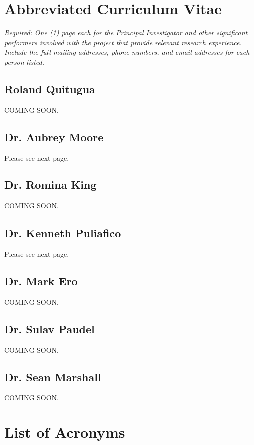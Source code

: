 \documentclass[11pt,english,letterpaper]{scrartcl}
\begin{document}
\appendix

\newpage

\section{Abbreviated Curriculum Vitae}

\textit{Required: One (1) page each for the Principal Investigator and other significant performers involved with the project that provide relevant research experience. Include the full mailing addresses, phone numbers, and email addresses for each person listed.}

\subsection{Roland Quitugua}
COMING SOON.

\subsection{Dr. Aubrey Moore}
Please see next page.


\subsection{Dr. Romina King}
COMING SOON.

\subsection{Dr. Kenneth Puliafico}
Please see next page.


\subsection{Dr. Mark Ero}
COMING SOON.

\subsection{Dr. Sulav Paudel}
COMING SOON.

\subsection{Dr. Sean Marshall}
COMING SOON.

\section{List of Acronyms}
\end{document}
